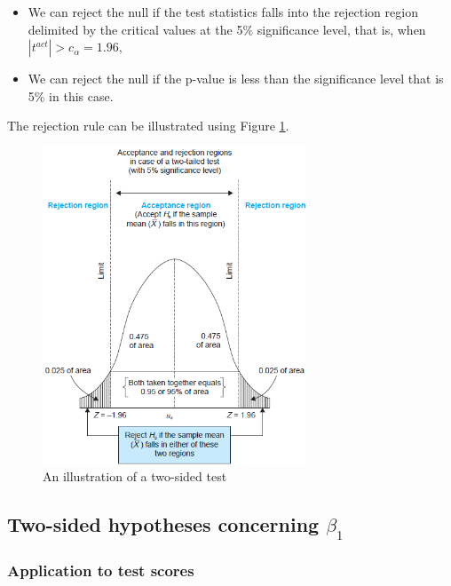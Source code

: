 \documentclass[a4paper,11pt]{article}
\begin{document}
\begin{itemize}
\begin{itemize}
\item We can reject the null if the test statistics falls into the
rejection region delimited by the critical values at the 5\%
significance level, that is, when \(|t^{act}| > c_{\alpha} = 1.96\),

\item We can reject the null if the p-value is less than the significance
level that is 5\% in this case.
\end{itemize}

The rejection rule can be illustrated using Figure \ref{fig:org313a2fc}.

\begin{figure}[htbp]
\centering
\includegraphics[width=0.7\textwidth]{./figure/fig9_1.png}
\caption{\label{fig:org313a2fc}
An illustration of a two-sided test}
\end{figure}
\end{itemize}


\subsection{Two-sided hypotheses concerning \(\beta_1\)}
\label{sec:orgc272b67}

\subsubsection*{Application to test scores}
\label{sec:org7d4ed86}
\end{document}
